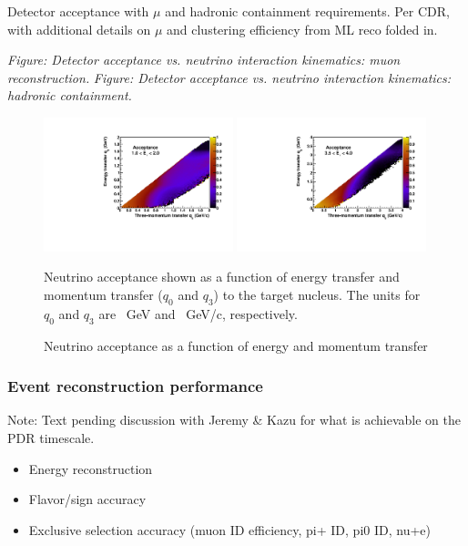 Detector acceptance with $\mu$ and hadronic containment requirements. Per CDR, with additional details on $\mu$ and clustering efficiency from ML reco folded in.

{\it Figure: Detector acceptance vs. neutrino interaction kinematics: muon reconstruction.}
{\it Figure: Detector acceptance vs. neutrino interaction kinematics: hadronic containment.}

\begin{figure}
\centering
\includegraphics[width=0.49\textwidth]{graphics/eff_q0q3_Ev_1000_2000.pdf}
\includegraphics[width=0.49\textwidth]{graphics/eff_q0q3_Ev_3500_4000.pdf}
\caption{Neutrino acceptance as a function of energy and momentum transfer}
{Neutrino acceptance shown as a function of energy transfer and momentum transfer ($q_0$ and $q_3$) to the target nucleus. The units for $q_0$ and $q_3$ are \SI{}{\giga\electronvolt} and \SI{}{\giga\electronvolt}/c, respectively.}
\label{fig:q0q3acc}
\end{figure}

\subsubsection{Event reconstruction performance}

Note: Text pending discussion with Jeremy \& Kazu for what is achievable on the PDR timescale.

\begin{itemize}
    \item Energy reconstruction
    \item Flavor/sign accuracy
    \item Exclusive selection accuracy (muon ID efficiency, pi+ ID, pi0 ID, nu+e)
\end{itemize}

